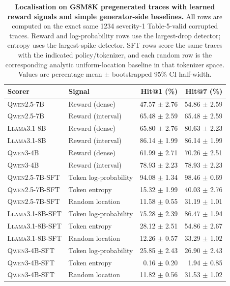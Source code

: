 \begin{table}[t]
\centering
\small
\renewcommand{\arraystretch}{1.08}
\begin{tabular}{l l r r}
\toprule
\textbf{Scorer} & \textbf{Signal} & \textbf{Hit@1 (\%)} & \textbf{Hit@7 (\%)} \\
\midrule
\textsc{Qwen2.5-7B} & Reward (dense) & 47.57 $\pm$ 2.76 & 54.86 $\pm$ 2.59 \\
\textsc{Qwen2.5-7B} & Reward (interval) & 65.48 $\pm$ 2.59 & 65.48 $\pm$ 2.59 \\
\textsc{Llama3.1-8B} & Reward (dense) & 65.80 $\pm$ 2.76 & 80.63 $\pm$ 2.23 \\
\textsc{Llama3.1-8B} & Reward (interval) & 86.14 $\pm$ 1.99 & 86.14 $\pm$ 1.99 \\
\textsc{Qwen3-4B} & Reward (dense) & 61.99 $\pm$ 2.71 & 70.26 $\pm$ 2.51 \\
\textsc{Qwen3-4B} & Reward (interval) & 78.93 $\pm$ 2.23 & 78.93 $\pm$ 2.23 \\
\midrule
\textsc{Qwen2.5-7B-SFT} & Token log-probability & 94.08 $\pm$ 1.34 & 98.46 $\pm$ 0.69 \\
\textsc{Qwen2.5-7B-SFT} & Token entropy & 15.32 $\pm$ 1.99 & 40.03 $\pm$ 2.76 \\
\textsc{Qwen2.5-7B-SFT} & Random location & 11.58 $\pm$ 0.55 & 31.19 $\pm$ 1.01 \\
\textsc{Llama3.1-8B-SFT} & Token log-probability & 75.28 $\pm$ 2.39 & 86.47 $\pm$ 1.94 \\
\textsc{Llama3.1-8B-SFT} & Token entropy & 28.12 $\pm$ 2.51 & 54.86 $\pm$ 2.67 \\
\textsc{Llama3.1-8B-SFT} & Random location & 12.26 $\pm$ 0.57 & 33.29 $\pm$ 1.02 \\
\textsc{Qwen3-4B-SFT} & Token log-probability & 25.85 $\pm$ 2.43 & 26.90 $\pm$ 2.43 \\
\textsc{Qwen3-4B-SFT} & Token entropy & 0.16 $\pm$ 0.20 & 1.94 $\pm$ 0.85 \\
\textsc{Qwen3-4B-SFT} & Random location & 11.82 $\pm$ 0.56 & 31.53 $\pm$ 1.02 \\
\bottomrule
\end{tabular}
\caption{\textbf{Localisation on GSM8K pregenerated traces with learned reward signals and simple generator-side baselines.} All rows are computed on the exact same 1234 severity-1 Table-5-valid corrupted traces. Reward and log-probability rows use the largest-drop detector; entropy uses the largest-spike detector. SFT rows score the same traces with the indicated policy/tokenizer, and each random row is the corresponding analytic uniform-location baseline in that tokenizer space. Values are percentage mean $\pm$ bootstrapped 95\% CI half-width.}
\label{tab:localisation_combined_reward_policy_hit1_hit7}
\end{table}
